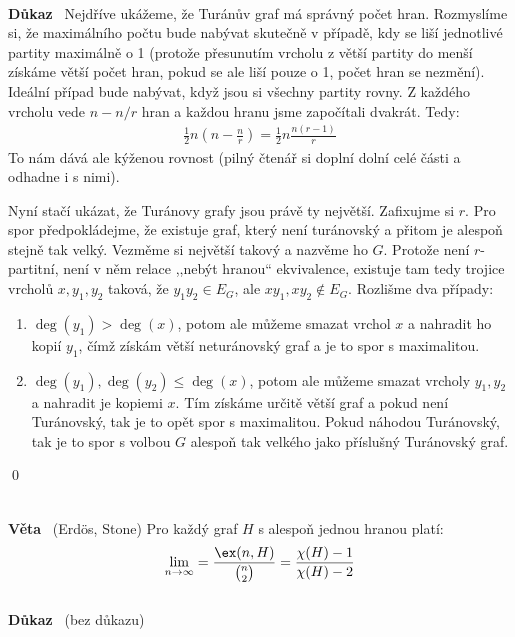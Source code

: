 \documentclass{article}
\renewcommand{\paragraph}[1]{\ \\\smallskip\noindent\textbf{#1}\ }
\begin{document}
\paragraph{Důkaz} Nejdříve ukážeme, že Turánův graf má správný počet hran.  
Rozmyslíme si, že maximálního počtu bude nabývat skutečně v případě, kdy se liší 
jednotlivé partity maximálně o 1 (protože přesunutím vrcholu z větší partity do 
menší získáme větší počet hran, pokud se ale liší pouze o 1, počet hran se 
nezmění). Ideální případ bude nabývat, když jsou si všechny partity rovny. Z 
každého vrcholu vede $n-n/r$ hran a každou hranu jsme započítali dvakrát. Tedy:
\begin{align}
	\frac{1}{2}
	n \left(n-\frac{n}{r}\right) = \frac{1}{2} n \frac{n(r-1)}{r}
\end{align}
To nám dává ale kýženou rovnost (pilný čtenář si doplní dolní celé části a 
odhadne i s nimi).

Nyní stačí ukázat, že Turánovy grafy jsou právě ty největší. Zafixujme si $r$. 
Pro spor předpokládejme, že existuje graf, který není turánovský a přitom je 
alespoň stejně tak velký.  Vezměme si největší takový a nazvěme ho $G$. Protože 
není $r$-partitní, není v něm relace ,,nebýt hranou`` ekvivalence, existuje tam 
tedy trojice vrcholů $x,y_1,y_2$ taková, že $y_1y_2 \in E_G$, ale $xy_1, xy_2 
\notin E_G$. Rozlišme dva případy:
\begin{enumerate}
	\item $\deg(y_1) > \deg(x)$, potom ale můžeme smazat vrchol $x$ a nahradit 
	ho kopií $y_1$, čímž získám větší neturánovský graf a je to spor s 
	maximalitou.
	\item $\deg(y_1), \deg(y_2) \leq \deg(x)$, potom ale můžeme smazat vrcholy 
	$y_1,y_2$ a nahradit je kopiemi $x$. Tím získáme určitě větší graf a pokud 
	není Turánovský, tak je to opět spor s maximalitou. Pokud náhodou 
	Turánovský, tak je to spor s volbou $G$ alespoň tak velkého jako příslušný 
	Turánovský graf.
\end{enumerate}
\qed


\paragraph{Věta} (Erdös, Stone) Pro každý graf $H$ s alespoň jednou hranou 
platí:
\begin{align}
	\lim_{n\to \infty} = \frac{\ex(n, H)}{\binom{n}{2}} = \frac{\chi(H) 
	-1}{\chi(H)-2}
\end{align}
\paragraph{Důkaz} (bez důkazu)
\end{document}
